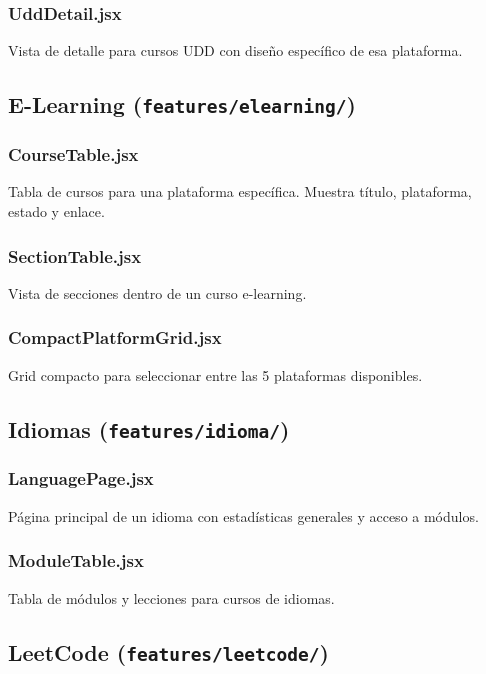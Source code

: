\documentclass[12pt,a4paper]{article}
\begin{document}
\subsubsection{UddDetail.jsx}

Vista de detalle para cursos UDD con diseño específico de esa plataforma.

\subsection{E-Learning (\texttt{features/elearning/})}

\subsubsection{CourseTable.jsx}

Tabla de cursos para una plataforma específica. Muestra título, plataforma, estado y enlace.

\subsubsection{SectionTable.jsx}

Vista de secciones dentro de un curso e-learning.

\subsubsection{CompactPlatformGrid.jsx}

Grid compacto para seleccionar entre las 5 plataformas disponibles.

\subsection{Idiomas (\texttt{features/idioma/})}

\subsubsection{LanguagePage.jsx}

Página principal de un idioma con estadísticas generales y acceso a módulos.

\subsubsection{ModuleTable.jsx}

Tabla de módulos y lecciones para cursos de idiomas.

\subsection{LeetCode (\texttt{features/leetcode/})}
\end{document}
